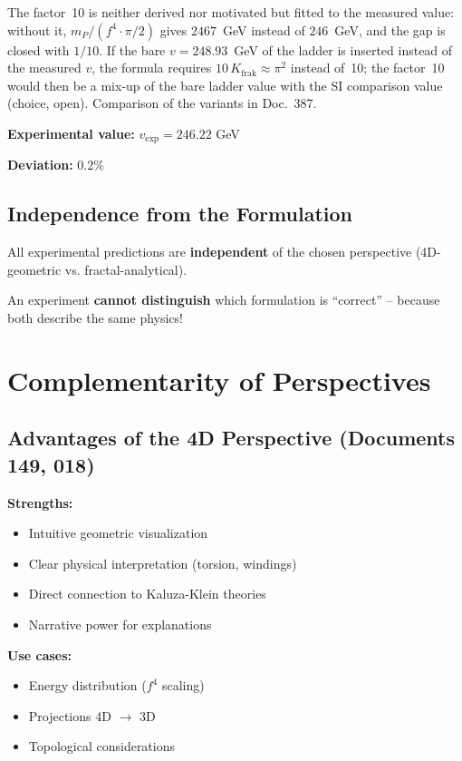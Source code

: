 	The factor~10 is neither derived nor motivated but fitted to the measured value: without it, $m_P/(f^4\cdot\pi/2)$ gives $2467$~GeV instead of $246$~GeV, and the gap is closed with $1/10$. If the bare $v=248.93$~GeV of the ladder is inserted instead of the measured $v$, the formula requires $10\,K_{\text{frak}}\approx\pi^2$ instead of~10; the factor~10 would then be a mix-up of the bare ladder value with the SI comparison value (choice, open). Comparison of the variants in Doc.~387.
	
	\textbf{Experimental value:} $v_{\exp} = 246.22$ GeV
	
	\textbf{Deviation:} 0.2\%
	
	\subsection{Independence from the Formulation}
	
	\begin{important}
		All experimental predictions are \textbf{independent} of the chosen perspective (4D-geometric vs. fractal-analytical).
		
		An experiment \textbf{cannot distinguish} which formulation is \enquote{correct} -- because both describe the same physics!
	\end{important}
	
	\section{Complementarity of Perspectives}
	
	\subsection{Advantages of the 4D Perspective (Documents 149, 018)}
	
	\textbf{Strengths:}
	\begin{itemize}
		\item Intuitive geometric visualization
		\item Clear physical interpretation (torsion, windings)
		\item Direct connection to Kaluza-Klein theories
		\item Narrative power for explanations
	\end{itemize}
	
	\textbf{Use cases:}
	\begin{itemize}
		\item Energy distribution ($f^4$ scaling)
		\item Projections 4D $\to$ 3D
		\item Topological considerations
	\end{itemize}
	
